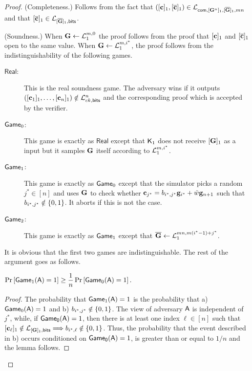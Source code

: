 \begin{proof}
(Completeness.)
Follows from the fact that $([\mathbf{c}]_1,[\overline{\mathbf{c}}]_1)\in\mathcal{L}_{\mathsf{com},[\mathbf{{G}}^n]_1,[\overline{\mathbf{{G}}}]_1,mn}$ and that $[\overline{\mathbf{c}}]_1\in\mathcal{L}_{[\overline{\mathbf{{G}}}]_1,\mathsf{bits}}$.

(Soundness.)
When $\mathbf{{G}}\gets\mathcal{L}_1^{m,0}$ the proof follows from the proof that $[\mathbf{c}]_1$ and $[{\overline{\mathbf{c}}}]_1$ open to the same value.
When $\mathbf{{G}}\gets\mathcal{L}_1^{m,i^*}$, the proof follows from the indistinguishability of the following games.

\begin{description}
\item[$\mathsf{Real}$:] This is the real soundness game. The adversary wins if it outputs $([\mathbf{c}_1]_1,\ldots,[\mathbf{c}_n]_1)\notin\mathcal{L}_{ck,\mathsf{bits}}^n$ and the corresponding proof which is accepted by the verifier.
\item[$\mathsf{Game}_0$:] This game is exactly as $\mathsf{Real}$ except that $\mathsf{K}_1$ does not receive $[\mathbf{{G}}]_1$ as a input but it samples $\mathbf{{G}}$ itself according to $\mathcal{L}_1^{m,i^*}$.
\item[$\mathsf{Game}_1$:] This game is exactly as $\mathsf{Game}_0$ except that the simulator picks a random $j^*\in[n]$ and uses $\mathbf{{G}}$ to check whether $\mathbf{c}_{j^*}=b_{i^*,j^*}\mathbf{g}_{i^*}+\tilde{w}\mathbf{g}_{n+1}$ such that $b_{i^*,j^*}\notin\{0,1\}$. It aborts if this is not the case.
\item[$\mathsf{Game}_2$:] This game is exactly as $\mathsf{Game}_1$ except that $\overline{\mathbf{{G}}}\gets\mathcal{L}_1^{mn, m(i^*-1)+j^*}$.
\end{description}

It is obvious that the first two games are indistinguishable. 
The rest of the argument goes as follows. 

\begin{lemma} $\Pr\left[ \mathsf{Game}_1(\mathsf{A})=1\right]\geq\dfrac{1}{n}\Pr\left[\mathsf{Game}_0(\mathsf{A})=1\right].$
\end{lemma}

\begin{proof}  The probability that
 $\mathsf{Game}_1(\mathsf{A})=1$ is the probability that  a) $\mathsf{Game}_0(\mathsf{A})=1$ and
b)  $b_{i^*,j^*} \notin \{0,1\}$. The view of adversary $\mathsf{A}$ is independent of $j^*$, while, if $\mathsf{Game_0}(\mathsf{A})=1$, then there is at least one index $\ell \in [n]$ such that $[\mathbf{c}_\ell]_1\notin\mathcal{L}_{[\mathbf{{G}}]_1,\mathsf{bits}}\Longrightarrow b_{i^*,\ell} \notin \{0,1\}$. Thus, 
the probability that the event described in b) occurs conditioned on $\mathsf{Game_0}(\mathsf{A})=1$, is greater than or equal to $1/n$ and the lemma follows.
\end{proof}


\end{proof}
